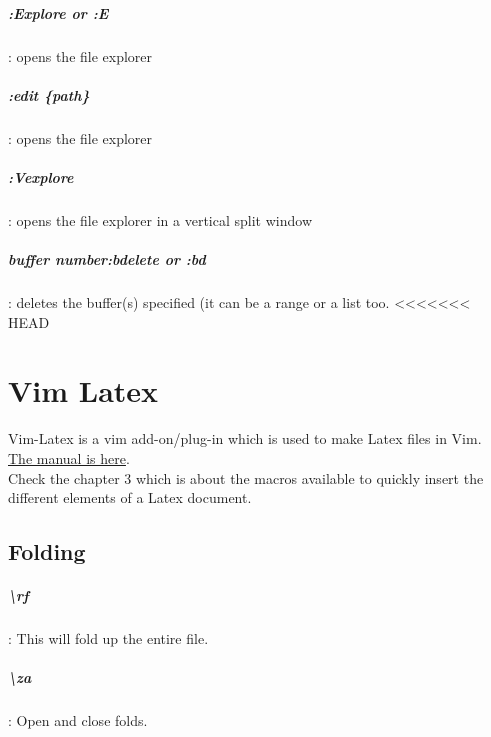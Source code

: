 \documentclass[10pt,letterpaper]{book}
\begin{document}
\paragraph{:Explore or :E}: opens the file explorer
\paragraph{:edit \{path\}}: opens the file explorer
\paragraph{:Vexplore}: opens the file explorer in a vertical split window
\paragraph{\textit{buffer number}:bdelete or :bd}: deletes the buffer(s) specified (it can be a range or a list too.
<<<<<<< HEAD

\chapter{Vim Latex}
Vim-Latex is a vim add-on/plug-in which is used to make Latex files in Vim.\\
\href{http://vim-latex.sourceforge.net/documentation/latex-suite/}{The manual is here}.\\
Check the chapter 3 which is about the macros available to quickly insert the different elements of a Latex document.
\section{Folding}
\paragraph{\textbackslash rf}: This will fold up the entire file.
\paragraph{\textbackslash za}: Open and close folds. 
\end{document}
